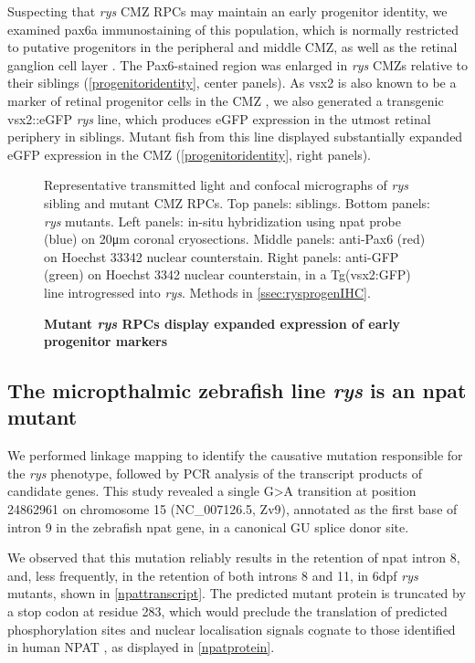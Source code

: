Suspecting that \textit{rys} CMZ RPCs may maintain an early progenitor identity, we examined pax6a immunostaining of this population, which is normally restricted to putative progenitors in the peripheral and middle CMZ, as well as the retinal ganglion cell layer \cite{Raymond2006}. The Pax6-stained region was enlarged in \textit{rys} CMZs relative to their siblings (\autoref{progenitoridentity}, center panels). As vsx2 is also known to be a marker of retinal progenitor cells in the CMZ \cite{Raymond2006}, we also generated a transgenic vsx2::eGFP \textit{rys} line, which produces eGFP expression in the utmost retinal periphery in siblings. Mutant fish from this line displayed substantially expanded eGFP expression in the CMZ (\autoref{progenitoridentity}, right panels).

\begin{figure}[!h]
    \caption{{\bf Mutant \textit{rys} RPCs display expanded expression of early progenitor markers}}
    Representative transmitted light and confocal micrographs of \textit{rys} sibling and mutant CMZ RPCs. Top panels: siblings. Bottom panels: \textit{rys} mutants. Left panels: in-situ hybridization using npat probe (blue) on 20\si{\micro\metre} coronal cryosections. Middle panels: anti-Pax6 (red) on Hoechst 33342 nuclear counterstain. Right panels: anti-GFP (green) on Hoechst 3342 nuclear counterstain, in a Tg(vsx2:GFP) line introgressed into \textit{rys}. 
    Methods in \autoref{ssec:rysprogenIHC}.
    \label{progenitoridentity}
\end{figure}

\FloatBarrier
\subsection{The micropthalmic zebrafish line \textit{rys} is an npat mutant}

We performed linkage mapping to identify the causative mutation responsible for the \textit{rys} phenotype, followed by PCR analysis of the transcript products of candidate genes. This study revealed a single G\textgreater{}A transition at position 24862961 on chromosome 15 (NC\_007126.5, Zv9), annotated as the first base of intron 9 in the zebrafish npat gene, in a canonical GU splice donor site. 

We observed that this mutation reliably results in the retention of npat intron 8, and, less frequently, in the retention of both introns 8 and 11, in 6dpf \textit{rys} mutants, shown in \autoref{npattranscript}. The predicted mutant protein is truncated by a stop codon at residue 283, which would preclude the translation of predicted phosphorylation sites and nuclear localisation signals cognate to those identified in human NPAT \cite{Ma2000,Sagara2002}, as displayed in \autoref{npatprotein}.

